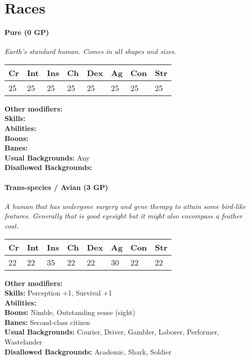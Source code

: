 \documentclass[12pt,a4paper,openany]{book}
\begin{document}
	\section{Races}
	\label{sec:racelist}
	\paragraph*{Pure (0 GP)}
	\textit{Earth's standard human. Comes in all shapes and sizes.}\par
	\begin{tabular}{|l|l|l|l|l|l|l|l|}
		\hline
		Cr & Int & Ins & Ch & Dex & Ag & Con & Str \\ \hline
		25 & 25 & 25 & 25 & 25 & 25 & 25 & 25 \\ \hline
	\end{tabular}\par
	\noindent\textbf{Other modifiers:} \\
	\textbf{Skills:} \\
	\textbf{Abilities:} \\
	\textbf{Boons:} \\
	\textbf{Banes:} \\
	\textbf{Usual Backgrounds:} Any\\
	\textbf{Disallowed Backgrounds:} 
	
	\hrulefill
	\paragraph*{Trans-species / Avian (3 GP)}
	\textit{A human that has undergone surgery and gene therapy to attain some bird-like features. Generally that is good eyesight but it might also encompass a feather coat.}\par
	\begin{tabular}{|l|l|l|l|l|l|l|l|}
		\hline
		Cr & Int & Ins & Ch & Dex & Ag & Con & Str \\ \hline
		22 & 22 & 35 & 22 & 22 & 30 & 22 & 22 \\ \hline
	\end{tabular}\par
	\noindent\textbf{Other modifiers:} \\
	\textbf{Skills:} Perception +1,	Survival +1\\
	\textbf{Abilities:} \\
	\textbf{Boons:} Nimble,	Outstanding sense (sight)\\
	\textbf{Banes:} Second-class citizen\\
	\textbf{Usual Backgrounds:} Courier, Driver, Gambler, Laborer, Performer, Wastelander\\
	\textbf{Disallowed Backgrounds:} Academic, Shark, Soldier
	
\end{document}
